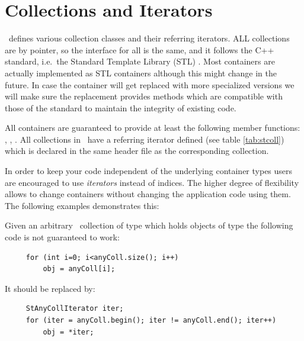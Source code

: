 \section{Collections and Iterators}
\label{sec:collections}
\StMcEvent\ defines various collection classes and their referring
iterators.  ALL collections are by pointer, so the interface for all is the
same, and it follows the C++
standard, i.e.~the Standard Template Library (STL) . Most
containers are actually implemented as STL containers although this
might change in the future. In case the container will get replaced with more
specialized versions we will
make sure the replacement provides methods which are compatible with those
of the standard to maintain the integrity of existing code.

All containers are guaranteed to provide at least the following member functions:
, , .  All collections in
\StMcEvent\ have a referring iterator defined (see table \ref{tab:stcoll})
which is declared in the same header file as the
corresponding collection.

In order to keep your code independent of the underlying container
types users are encouraged to use \textit{iterators} instead of
indices. The higher degree of flexibility allows to change containers
without changing the application code using them. The following
examples demonstrates this:

Given an arbitrary \StMcEvent\ collection  of type 
which holds objects of type  the following code is not guaranteed to work:
\begin{verbatim}
     for (int i=0; i<anyColl.size(); i++)
         obj = anyColl[i];
\end{verbatim}
It should be replaced by:
\begin{verbatim}
     StAnyCollIterator iter;
     for (iter = anyColl.begin(); iter != anyColl.end(); iter++)
         obj = *iter;
\end{verbatim}


